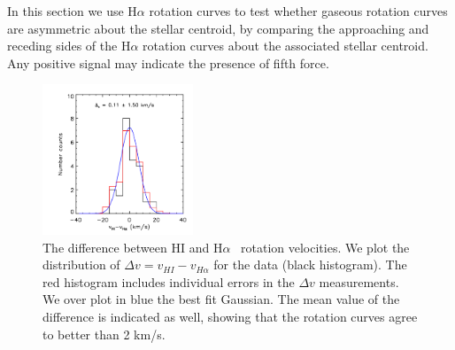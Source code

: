 \documentclass{emulateapj}
\newcommand{\ha}{H$\alpha$}
\begin{document}
In this section we use \ha{} rotation curves to test
whether gaseous rotation curves are asymmetric about the stellar centroid,
by comparing the approaching and receding sides of the \ha{} rotation curves
about the associated stellar centroid. Any
positive signal may indicate the presence of fifth force.

\begin{figure}
\begin{center}
\includegraphics[trim= 0cm 0cm 0cm 0cm, clip = true,
width=0.4\textwidth]{figures/vivalpha.png}
\caption{The difference between HI and \ha~ rotation velocities.
We plot the distribution of $\Delta {v}=v_{HI}-v_{H\alpha}$ for the 
\citet{Swaters2009} data (black histogram). The red histogram includes 
individual errors in the $\Delta v$ measurements. We over plot in
blue the best fit Gaussian. The mean value of the difference is indicated as well, showing that the 
rotation curves agree
to better than 2 km/s.}
\label{h1-ha-rot}
\end{center}
\end{figure}
\end{document}
